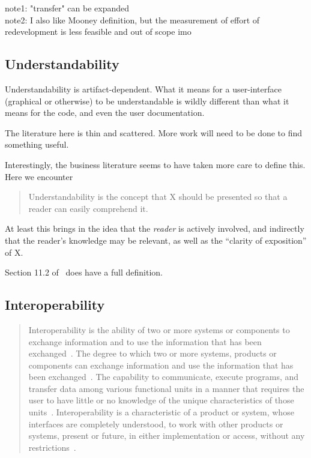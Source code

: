 \documentclass[letterpaper,cleveref]{lipics-v2019}
\theoremstyle{definition}
\begin{document}
note1: "transfer" can be expanded\\
note2: I also like Mooney definition, but the measurement of effort of redevelopment is less feasible and out of scope imo
\newline


 

\subsection{Understandability}

Understandability is artifact-dependent. What it means for a user-interface (graphical
or otherwise) to be understandable is wildly different than what it means for the code,
and even the user documentation.

The literature here is thin and scattered.  More work will need to be done to find
something useful.

Interestingly, the business literature seems to have taken more care to define this.
Here we encounter
\begin{quote}
Understandability is the concept that X should be presented
so that a reader can easily comprehend it.
\end{quote}
At least this brings in the idea that the \emph{reader} is actively involved, and
indirectly that the reader's knowledge may be relevant, as well as the
``clarity of exposition'' of X.

Section 11.2 of~\cite{adams2015nonfunctional} does have a full definition.

\subsection{Interoperability}

\begin{quotation}
	\noindent Interoperability is the ability of two or more systems or components to exchange information and to use the information that has been exchanged~\cite{IEEE1991}.
	\noindent The degree to which two or more systems, products or components can exchange information and use the information that has been exchanged~\cite{ISO/IEC25010}.
	\noindent The capability to communicate, execute programs, and transfer data among various functional units in a manner that requires the user to have little or no knowledge of the unique characteristics of those units~\cite{ISO/IEC/IEEE24765}.
	\noindent Interoperability is a characteristic of a product or system, whose interfaces are completely understood, to work with other products or systems, present or future, in either implementation or access, without any restrictions~\cite{AFUL}.
\end{quotation}
\end{document}
